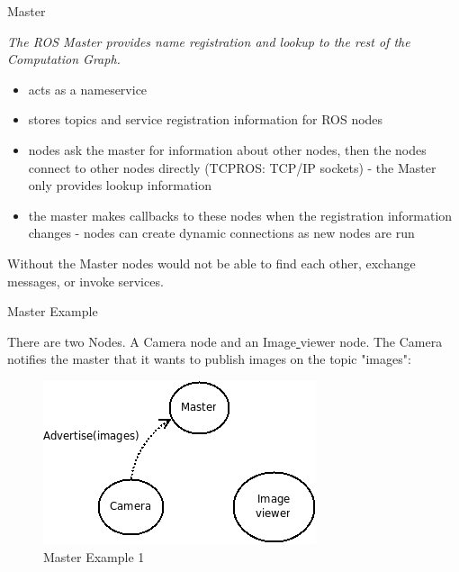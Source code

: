 \documentclass{beamer}
\begin{document}
\begin{frame}{Master}
	\begin{definition}[Master]
		\textit{The ROS Master provides name registration and lookup to the rest of the Computation Graph.}
	\end{definition}
	
	\begin{itemize}
		\item acts as a nameservice 
		\item stores topics and service registration information for ROS nodes
		\item nodes ask the master for information about other nodes, then the nodes connect to other nodes directly (TCPROS: TCP/IP sockets) -  the Master only provides lookup information
		\item the master makes callbacks to these nodes when the registration information changes -  nodes can create dynamic connections as new nodes are run
		
	\end{itemize}
	Without the Master nodes would not be able to find each other, exchange messages, or invoke services.
	
\end{frame}

\begin{frame}{Master Example}
	
	There are two Nodes. A Camera node and an Image\underline{ }viewer node. The Camera notifies the master that it wants to publish images on the topic "images":
	 
		  \begin{figure}[H]
		  	\centering
		  	\includegraphics[scale=0.7]{./images/ROS_master_example_english_1.png}
		  	\caption{Master Example 1}
		  	\label{fig:ros_master_example_1}
		  \end{figure}
	
	
\end{frame}
\end{document}
